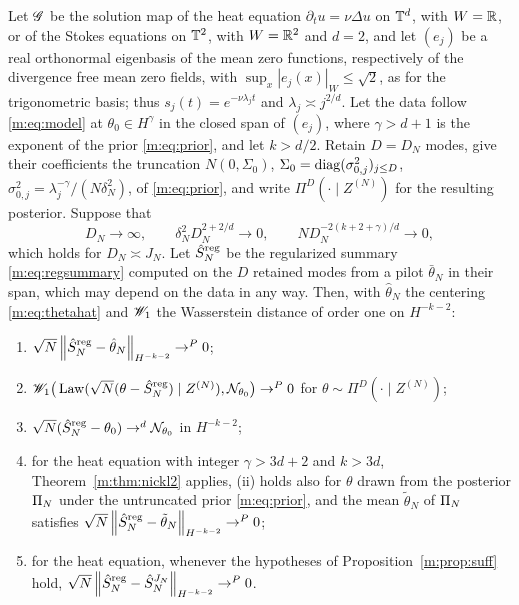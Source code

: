 \begin{proposition}\label{m:prop:regheat}
Let $\mathscr{G}$ be the solution map of the heat equation $\partial_tu=\nu\Delta u$ on $\mathbb{T}^d$, with $W=\mathbb{R}$, or of the Stokes equations on $\mathbb{T}^2$, with $W=\mathbb{R}^2$ and $d=2$, and let $(e_j)$ be a real orthonormal eigenbasis of the mean zero functions, respectively of the divergence free mean zero fields, with $\sup_x|e_j(x)|_W\le\sqrt2$, as for the trigonometric basis; thus $s_j(t)=e^{-\nu\lambda_jt}$ and $\lambda_j\asymp j^{2/d}$. Let the data follow \eqref{m:eq:model} at $\theta_0\in H^\gamma$ in the closed span of $(e_j)$, where $\gamma>d+1$ is the exponent of the prior \eqref{m:eq:prior}, and let $k>d/2$. Retain $D=D_N$ modes, give their coefficients the truncation $N(0,\Sigma_0)$, $\Sigma_0=\operatorname{diag}(\sigma^2_{0,j})_{j\le D}$, $\sigma^2_{0,j}=\lambda_j^{-\gamma}/(N\delta_N^2)$, of \eqref{m:eq:prior}, and write $\Pi^D(\cdot\mid Z^{(N)})$ for the resulting posterior. Suppose that
\[
D_N\to\infty,\qquad\delta_N^2D_N^{2+2/d}\to0,\qquad ND_N^{-2(k+2+\gamma)/d}\to0 ,
\]
which holds for $D_N\asymp J_N$. Let $\hat S^{\rm reg}_N$ be the regularized summary \eqref{m:eq:regsummary} computed on the $D$ retained modes from a pilot $\bar\theta_N$ in their span, which may depend on the data in any way. Then, with $\hat\theta_N$ the centering \eqref{m:eq:thetahat} and $\mathscr{W}_1$ the Wasserstein distance of order one on $H^{-k-2}$:
\begin{enumerate}[label=(\roman*),nosep]
\item $\sqrt N\left\|\hat S^{\rm reg}_N-\hat\theta_N\right\|_{H^{-k-2}}\to^P0$;
\item $\mathscr{W}_1\big(\operatorname{Law}(\sqrt N(\theta-\hat S^{\rm reg}_N)\mid Z^{(N)}),\mathcal{N}_{\theta_0}\big)\to^P0$ for $\theta\sim\Pi^D(\cdot\mid Z^{(N)})$;
\item $\sqrt N(\hat S^{\rm reg}_N-\theta_0)\to^d\mathcal{N}_{\theta_0}$ in $H^{-k-2}$;
\item for the heat equation with integer $\gamma>3d+2$ and $k>3d$, Theorem~\ref{m:thm:nickl2} applies, (ii) holds also for $\theta$ drawn from the posterior $\Pi_N$ under the untruncated prior \eqref{m:eq:prior}, and the mean $\tilde\theta_N$ of $\Pi_N$ satisfies $\sqrt N\left\|\hat S^{\rm reg}_N-\tilde\theta_N\right\|_{H^{-k-2}}\to^P0$;
\item for the heat equation, whenever the hypotheses of Proposition~\ref{m:prop:suff} hold, $\sqrt N\left\|\hat S^{\rm reg}_N-\hat S^{J_N}_N\right\|_{H^{-k-2}}\to^P0$.
\end{enumerate}
\end{proposition}

